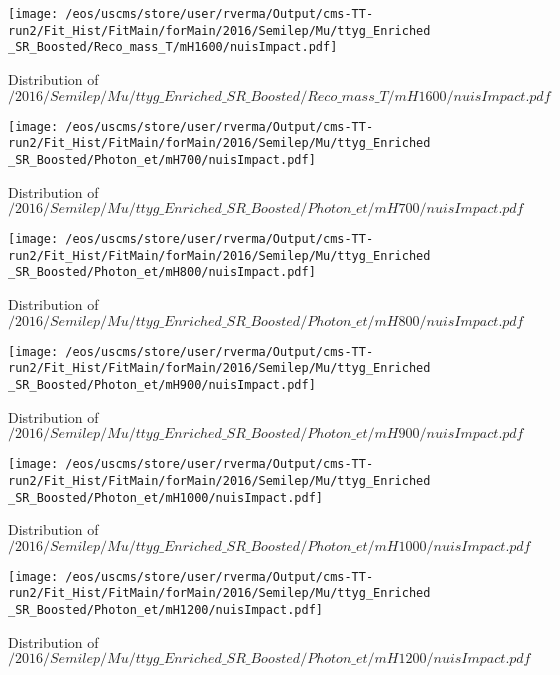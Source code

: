\begin{figure}
\centering
\texttt{[image: /eos/uscms/store/user/rverma/Output/cms-TT-run2/Fit\_Hist/FitMain/forMain/2016/Semilep/Mu/ttyg\_Enriched\_SR\_Boosted/Reco\_mass\_T/mH1600/nuisImpact.pdf]}
\caption{Distribution of $/2016/Semilep/Mu/ttyg\_Enriched\_SR\_Boosted/Reco\_mass\_T/mH1600/nuisImpact.pdf$}
\end{figure}

\begin{figure}
\centering
\texttt{[image: /eos/uscms/store/user/rverma/Output/cms-TT-run2/Fit\_Hist/FitMain/forMain/2016/Semilep/Mu/ttyg\_Enriched\_SR\_Boosted/Photon\_et/mH700/nuisImpact.pdf]}
\caption{Distribution of $/2016/Semilep/Mu/ttyg\_Enriched\_SR\_Boosted/Photon\_et/mH700/nuisImpact.pdf$}
\end{figure}

\begin{figure}
\centering
\texttt{[image: /eos/uscms/store/user/rverma/Output/cms-TT-run2/Fit\_Hist/FitMain/forMain/2016/Semilep/Mu/ttyg\_Enriched\_SR\_Boosted/Photon\_et/mH800/nuisImpact.pdf]}
\caption{Distribution of $/2016/Semilep/Mu/ttyg\_Enriched\_SR\_Boosted/Photon\_et/mH800/nuisImpact.pdf$}
\end{figure}

\begin{figure}
\centering
\texttt{[image: /eos/uscms/store/user/rverma/Output/cms-TT-run2/Fit\_Hist/FitMain/forMain/2016/Semilep/Mu/ttyg\_Enriched\_SR\_Boosted/Photon\_et/mH900/nuisImpact.pdf]}
\caption{Distribution of $/2016/Semilep/Mu/ttyg\_Enriched\_SR\_Boosted/Photon\_et/mH900/nuisImpact.pdf$}
\end{figure}

\begin{figure}
\centering
\texttt{[image: /eos/uscms/store/user/rverma/Output/cms-TT-run2/Fit\_Hist/FitMain/forMain/2016/Semilep/Mu/ttyg\_Enriched\_SR\_Boosted/Photon\_et/mH1000/nuisImpact.pdf]}
\caption{Distribution of $/2016/Semilep/Mu/ttyg\_Enriched\_SR\_Boosted/Photon\_et/mH1000/nuisImpact.pdf$}
\end{figure}

\begin{figure}
\centering
\texttt{[image: /eos/uscms/store/user/rverma/Output/cms-TT-run2/Fit\_Hist/FitMain/forMain/2016/Semilep/Mu/ttyg\_Enriched\_SR\_Boosted/Photon\_et/mH1200/nuisImpact.pdf]}
\caption{Distribution of $/2016/Semilep/Mu/ttyg\_Enriched\_SR\_Boosted/Photon\_et/mH1200/nuisImpact.pdf$}
\end{figure}

